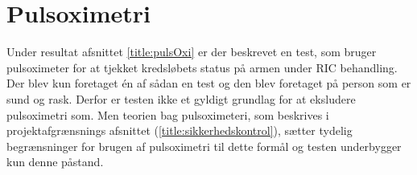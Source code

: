 \section{Pulsoximetri}
Under resultat afsnittet \ref{title:pulsOxi} er der beskrevet en test, som bruger pulsoximeter for at tjekket kredsløbets status på armen under RIC behandling. Der blev kun foretaget én af sådan en test og den blev foretaget på person som er sund og rask. Derfor er testen ikke et gyldigt grundlag for at eksludere pulsoximetri som. Men teorien bag pulsoximeteri, som beskrives i projektafgrænsnings afsnittet (\ref{title:sikkerhedskontrol}), sætter tydelig begrænsninger for brugen af pulsoximetri til dette formål og testen underbygger kun denne påstand. 



